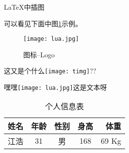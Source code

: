 \documentclass{ctexart}
\begin{document}
    
    \LuaTeX{}

    \LaTeX{}中插图

    可以看见下面中图\ref{fig-logo}示例。
    \begin{figure}[htbp]
        \centering
        \caption{ \LuaTeX 图标--Logo}\label{fig-logo}
        \texttt{[image: lua.jpg]}
    \end{figure}

    这又是个什么\texttt{[image: timg]}??

    嘿嘿\texttt{[image: lua.jpg]}这是文本呀

    \begin{table}[h]
        \centering
        \begin{tabular}{|p{2.5cm \c}| c | c | c | r|}
            \hline
            姓名 & 年龄 & 性别 & 身高 & 体重 \\
            \hline
            \hline
            江浩 & 31  &  男 & 168 & 69 Kg\\
            \hline
        \end{tabular}
        \caption{个人信息表}
    \end{table}
\end{document}
